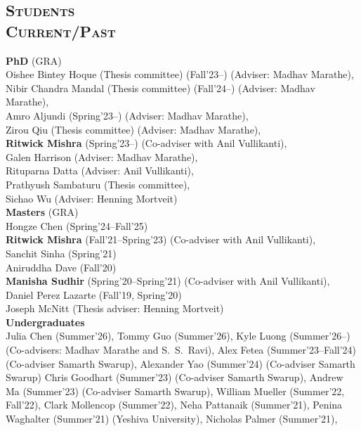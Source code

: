 \documentclass[margin,10pt]{res}
\begin{document}
\begin{resume}
\section{\textnormal{\textsc{Students \\Current/Past}}}
\noindent\textbf{PhD} (GRA)\\
Oishee Bintey Hoque (Thesis committee) (Fall'23--) (Adviser: Madhav Marathe),\\
Nibir Chandra Mandal (Thesis committee) (Fall'24--) (Adviser: Madhav Marathe),\\
Amro Aljundi (Spring'23--) (Adviser: Madhav Marathe),\\
Zirou Qiu (Thesis committee) (Adviser: Madhav Marathe),\\
\textbf{Ritwick Mishra} (Spring'23--) (Co-adviser with Anil
Vullikanti),\\
Galen Harrison (Adviser: Madhav Marathe),\\
Rituparna Datta (Adviser: Anil Vullikanti),\\
Prathyush Sambaturu (Thesis committee),\\
Sichao Wu (Adviser: Henning Mortveit)\vspace{.2cm}\\
\noindent\textbf{Masters} (GRA)\\
Hongze Chen (Spring'24--Fall'25)\\
\textbf{Ritwick Mishra} (Fall'21--Spring'23) (Co-adviser with Anil
Vullikanti),\\
Sanchit Sinha (Spring'21)\\
Aniruddha Dave (Fall'20)\\
\textbf{Manisha Sudhir} (Spring'20--Spring'21) (Co-adviser with Anil
Vullikanti),\\
Daniel Perez Lazarte (Fall'19, Spring'20)\\
Joseph McNitt (Thesis adviser: Henning Mortveit)\vspace{.2cm}\\
\noindent\textbf{Undergraduates}\\
Julia Chen (Summer'26),
Tommy Guo (Summer'26),
Kyle Luong (Summer'26--) (Co-advisers: Madhav Marathe and S.~S.~Ravi),
Alex Fetea (Summer'23--Fall'24) (Co-adviser Samarth Swarup),
Alexander Yao (Summer'24) (Co-adviser Samarth Swarup)
Chris Goodhart (Summer'23) (Co-adviser Samarth Swarup),
Andrew Ma (Summer'23) (Co-adviser Samarth Swarup),
William Mueller (Summer'22, Fall'22),
Clark Mollencop (Summer'22),
Neha Pattanaik (Summer'21),
Penina Waghalter (Summer'21) (Yeshiva University),
Nicholas Palmer (Summer'21),

\end{resume}
\end{document}
